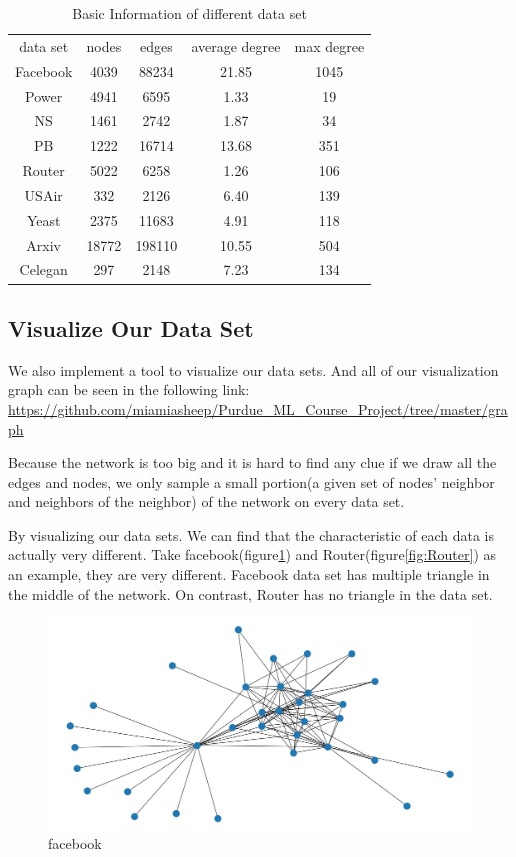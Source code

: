 \documentclass[12pt]{article}
\begin{document}
\begin{table}
\begin{center}
	\begin{tabular}{|c|c|c|c|c|}
		\hline
		data set & nodes & edges & average degree & max degree \\
		Facebook & 4039 & 88234 & 21.85 & 1045 \\
		Power & 4941 & 6595 & 1.33 & 19 \\
		NS & 1461 & 2742 & 1.87 & 34 \\
		PB & 1222 & 16714 & 13.68 & 351 \\
		Router & 5022 & 6258 & 1.26 & 106 \\
		USAir & 332 & 2126 & 6.40 & 139 \\
		Yeast & 2375 & 11683 & 4.91 & 118 \\
		Arxiv & 18772 & 198110 & 10.55 & 504 \\
		Celegan & 297 & 2148 & 7.23 & 134 \\
		\hline 
	\end{tabular}
	\caption{Basic Information of different data set}
	\label{tab:info}
\end{center}
\end{table}

\subsection{Visualize Our Data Set}
We also implement a tool to visualize our data sets. And all of our visualization graph can be seen in the following link: \url{https://github.com/miamiasheep/Purdue_ML_Course_Project/tree/master/graph}

Because the network is too big and it is hard to find any clue if we draw all the edges and nodes, we only sample a small portion(a given set of nodes' neighbor and neighbors of the neighbor) of the network on every data set.  


By visualizing our data sets. We can find that the characteristic of each data is actually very different. Take facebook(figure\ref{fig:facebook}) and Router(figure\ref{fig:Router}) as an example, they are very different. Facebook data set has multiple triangle in the middle of the network. On contrast, Router has no triangle in the data set.


\begin{figure}[h]
\centering
\includegraphics[scale=0.3]{Facebook}
\caption{facebook}
\label{fig:facebook}
\end{figure}
\end{document}
